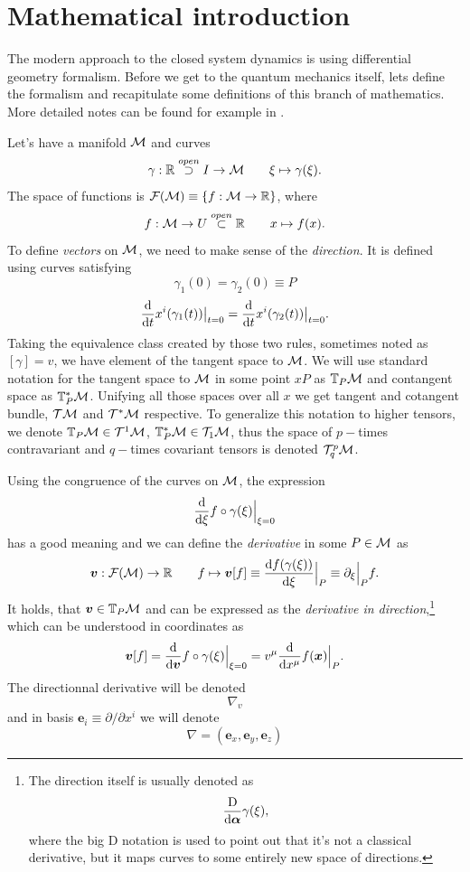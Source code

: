 \chapter{Mathematical introduction}
The modern approach to the closed system dynamics is using differential geometry formalism. Before we get to the quantum mechanics itself, lets define the formalism and recapitulate some definitions of this branch of mathematics. More detailed notes can be found for example in \citep{fecko}.

Let's have a manifold $\mathcal{M}$ and curves 
$$\gamma:\mathbb{R} \overset{open}{\supset} I \rightarrow \mathcal{M} \qquad \xi\mapsto \gamma(\xi).$$ 
The space of functions is $\mathcal{F}(\mathcal{M})\equiv\{f:\mathcal{M}\rightarrow \mathbb{R}\}$, where 
$$f:\mathcal{M}\rightarrow U\overset{open}{\subset} \mathbb{R} \qquad x\mapsto f(x).$$
To define \emph{vectors} on $\mathcal{M}$, we need to make sense of the \emph{direction}. It is defined using curves satisfying 
$$\gamma_1(0)=\gamma_2(0)\equiv P$$
$$\frac{\mathrm{d} }{\mathrm{d} t}x^i(\gamma_1(t))\big|_{t=0}=\frac{\mathrm{d} }{\mathrm{d} t}x^i(\gamma_2(t))\big|_{t=0}.$$
Taking the equivalence class created by those two rules, sometimes noted as $[\gamma]=v$, we have element of the tangent space to $\mathcal{M}$. We will use standard notation for the tangent space to $\mathcal{M}$ in some point $xP$ as $\mathbb{T}_P\mathcal{M}$ and contangent space as $\mathbb{T}^*_P\mathcal{M}$. Unifying all those spaces over all $x$ we get tangent and cotangent bundle, $\mathcal{T}\mathcal{M}$ and $\mathcal{T}^*\mathcal{M}$ respective. To generalize this notation to higher tensors, we denote $\mathbb{T}_P\mathcal{M}\in \mathcal{T}^1\mathcal{M}$, $\mathbb{T}^*_P\mathcal{M}\in \mathcal{T}_1\mathcal{M}$, thus the space of $p-$times contravariant and $q-$times covariant tensors is denoted $\mathcal{T}^p_q\mathcal{M}$.

Using the congruence of the curves on $\mathcal{M}$, the expression 
\begin{equation}
    \frac{\mathrm{d} }{\mathrm{d} \xi}f\circ \gamma(\xi)\Big|_{\xi=0}
\end{equation}
has a good meaning and we can define the \emph{derivative} in some $P\in\mathcal{M}$ as
\begin{equation}
    \bm v: \mathcal{F}(\mathcal{M})\rightarrow \mathbb{R} \qquad f\mapsto \bm v[f]\equiv \frac{\mathrm{d} f(\gamma(\xi))}{\mathrm{d} \xi}\Big|_P \equiv \partial_\xi\Big|_P f .
\end{equation}
It holds, that $\bm v\in \mathbb{T}_P\mathcal{M}$ and can be expressed as the \emph{derivative in direction},\footnote{
        The direction itself is usually denoted as
        \begin{equation}
            \frac{\mathrm{D}}{\mathrm{d}\bm\alpha}\gamma(\xi),
        \end{equation}
        where the big D notation is used to point out that it's not a classical derivative, but it maps curves to some entirely new space of directions.
    } 
which can be understood in coordinates as
\begin{equation}
    \bm v[f] = \frac{\mathrm{d} }{\mathrm{d} \bm v} f\circ \gamma(\xi)\Big|_{\xi=0}=v^\mu\frac{\mathrm{d} }{\mathrm{d} x^\mu} f(\bm x)\Big|_{P}.
\end{equation}
The directionnal derivative will be denoted 
$$\nabla_v$$
and in basis $\bm e_i \equiv \partial/\partial x^i$ we will denote 
$$\nabla=(\bm e_x, \bm e_y,\bm e_z)$$



